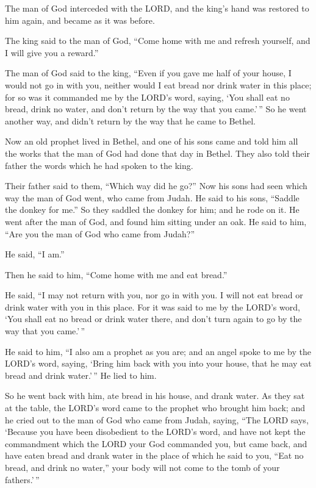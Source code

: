 The man of God interceded with the LORD, and the king's hand was
restored to him again, and became as it was before.

 The king said to the man of God, ``Come home with me and
refresh yourself, and I will give you a reward.''

 The man of God said to the king, ``Even if you gave me half
of your house, I would not go in with you, neither would I eat bread nor
drink water in this place;  for so was it commanded me by
the LORD's word, saying, `You shall eat no bread, drink no water, and
don't return by the way that you came.'\,''  So he went
another way, and didn't return by the way that he came to Bethel.

 Now an old prophet lived in Bethel, and one of his sons
came and told him all the works that the man of God had done that day in
Bethel. They also told their father the words which he had spoken to the
king.

 Their father said to them, ``Which way did he go?'' Now
his sons had seen which way the man of God went, who came from Judah.
 He said to his sons, ``Saddle the donkey for me.'' So they
saddled the donkey for him; and he rode on it.  He went
after the man of God, and found him sitting under an oak. He said to
him, ``Are you the man of God who came from Judah?''

He said, ``I am.''

 Then he said to him, ``Come home with me and eat bread.''

 He said, ``I may not return with you, nor go in with you.
I will not eat bread or drink water with you in this place.
 For it was said to me by the LORD's word, `You shall eat
no bread or drink water there, and don't turn again to go by the way
that you came.'\,''

 He said to him, ``I also am a prophet as you are; and an
angel spoke to me by the LORD's word, saying, `Bring him back with you
into your house, that he may eat bread and drink water.'\,'' He lied to
him.

 So he went back with him, ate bread in his house, and
drank water.  As they sat at the table, the LORD's word
came to the prophet who brought him back;  and he cried out
to the man of God who came from Judah, saying, ``The LORD says, `Because
you have been disobedient to the LORD's word, and have not kept the
commandment which the LORD your God commanded you,  but
came back, and have eaten bread and drank water in the place of which he
said to you, ``Eat no bread, and drink no water,'' your body will not
come to the tomb of your fathers.'\,''


